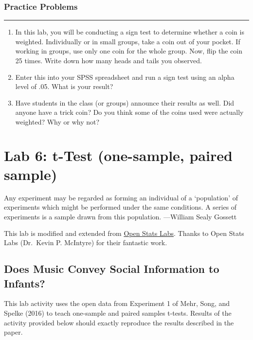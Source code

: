 \documentclass[
]{book}
\begin{document}
\hypertarget{practice-problems-3}{%
\subsection{Practice Problems}\label{practice-problems-3}}

\begin{center}\rule{0.5\linewidth}{0.5pt}\end{center}

\begin{enumerate}
\def\labelenumi{\arabic{enumi}.}
\item
  In this lab, you will be conducting a sign test to determine whether a coin is weighted. Individually or in small groups, take a coin out of your pocket. If working in groups, use only one coin for the whole group. Now, flip the coin 25 times. Write down how many heads and tails you observed.
\item
  Enter this into your SPSS spreadsheet and run a sign test using an alpha level of .05. What is your result?
\item
  Have students in the class (or groups) announce their results as well. Did anyone have a trick coin? Do you think some of the coins used were actually weighted? Why or why not?
\end{enumerate}

\hypertarget{lab-6-t-test-one-sample-paired-sample}{%
\chapter{Lab 6: t-Test (one-sample, paired sample)}\label{lab-6-t-test-one-sample-paired-sample}}

{Any experiment may be regarded as forming an individual of a `population' of experiments which might be performed under the same conditions. A series of experiments is a sample drawn from this population. ---William Sealy Gossett}

This lab is modified and extended from \href{https://sites.trinity.edu/osl}{Open Stats Labs}. Thanks to Open Stats Labs (Dr.~Kevin P. McIntyre) for their fantastic work.

\hypertarget{does-music-convey-social-information-to-infants}{%
\section{Does Music Convey Social Information to Infants?}\label{does-music-convey-social-information-to-infants}}

This lab activity uses the open data from Experiment 1 of Mehr, Song, and Spelke (2016) to teach one-sample and paired samples t-tests. Results of the activity provided below should exactly reproduce the results described in the paper.
\end{document}
